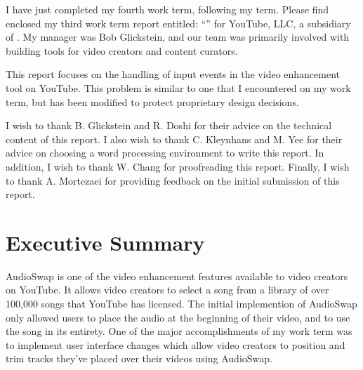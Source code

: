 \documentclass[se,resubmit]{uw-wkrpt}
\begin{document}
\frontmatter

\begin{letter}
I have just completed my fourth work term, following my \theterm{} term.  Please
find enclosed my third work term report entitled: ``\thetitle'' for YouTube,
LLC, a subsidiary of \theemployer.  My manager was Bob Glickstein, and our team
was primarily involved with building tools for video creators and content
curators.

This report focuses on the handling of input events in the video enhancement
tool on YouTube. This problem is similar to one that I encountered on my work
term, but has been modified to protect proprietary design decisions.

I wish to thank B. Glickstein and R. Doshi for their advice on the technical
content of this report. I also wish to thank C. Kleynhans and M. Yee for their
advice on choosing a word processing environment to write this report. In
addition, I wish to thank W. Chang for proofreading this report. Finally, I wish
to thank A. Mortezaei for providing feedback on the initial submission of this
report.
\end{letter}

\section{Executive Summary}
AudioSwap is one of the video enhancement features available to video creators
on YouTube. It allows video creators to select a song from a library of over
100,000 songs that YouTube has licensed. The initial implemention of AudioSwap
only allowed users to place the audio at the beginning of their video, and to
use the song in its entirety. One of the major accomplishments of my work term
was to implement user interface changes which allow video creators to position
and trim tracks they've placed over their videos using AudioSwap.
\end{document}
